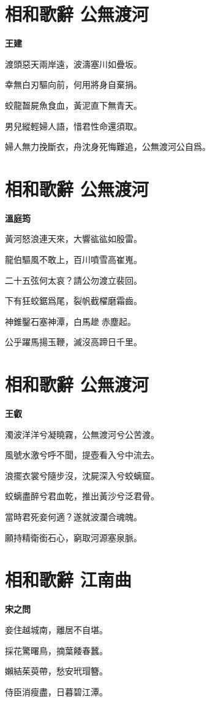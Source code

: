 \documentclass[12pt,a4paper]{ctexbook}
\begin{document}
\section{相和歌辭 公無渡河}
\textbf{王建}\par\vspace{0.5em}
渡頭惡天兩岸遠，波濤塞川如疊坂。\par
幸無白刃驅向前，何用將身自棄捐。\par
蛟龍齧屍魚食血，黃泥直下無青天。\par
男兒縱輕婦人語，惜君性命還須取。\par
婦人無力挽斷衣，舟沈身死悔難追，公無渡河公自爲。\par

\section{相和歌辭 公無渡河}
\textbf{溫庭筠}\par\vspace{0.5em}
黃河怒浪連天來，大響谹谹如殷雷。\par
龍伯驅風不敢上，百川噴雪高崔嵬。\par
二十五弦何太哀？請公勿渡立裴回。\par
下有狂蛟鋸爲尾，裂帆截櫂磨霜齒。\par
神錐鑿石塞神潭，白馬䟃𧽼赤塵起。\par
公乎躍馬揚玉鞭，滅沒高蹄日千里。\par

\section{相和歌辭 公無渡河}
\textbf{王叡}\par\vspace{0.5em}
濁波洋洋兮凝曉霧，公無渡河兮公苦渡。\par
風號水激兮呼不聞，提壺看入兮中流去。\par
浪擺衣裳兮隨步沒，沈屍深入兮蛟螭窟。\par
蛟螭盡醉兮君血乾，推出黃沙兮泛君骨。\par
當時君死妾何適？遂就波瀾合魂魄。\par
願持精衛銜石心，窮取河源塞泉脈。\par

\section{相和歌辭 江南曲}
\textbf{宋之問}\par\vspace{0.5em}
妾住越城南，離居不自堪。\par
採花驚曙鳥，摘葉餧春蠶。\par
嬾結茱萸帶，愁安玳瑁簪。\par
侍臣消瘦盡，日暮碧江潭。\par
\end{document}
